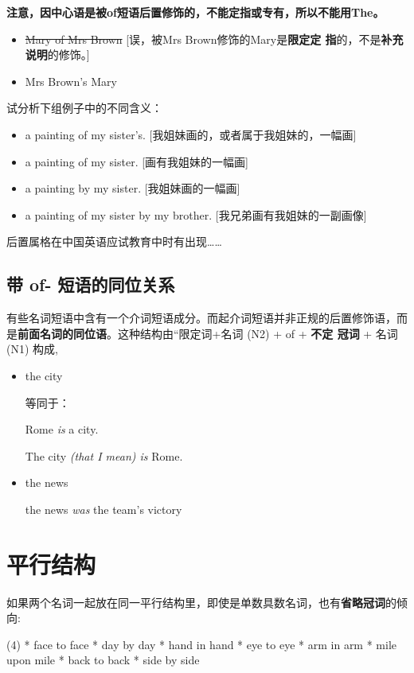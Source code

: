 \textbf{注意，因中心语是被of短语后置修饰的，不能定指或专有，所以不能用The。}

\begin{itemize}
\item \sout{Mary of Mrs Brown} [误，被Mrs Brown修饰的Mary是\textbf{限定定
    指}的，不是\textbf{补充说明}的修饰。]

\item Mrs Brown's Mary
\end{itemize}

试分析下组例子中的不同含义：
\begin{itemize}
\item a painting of my sister's. [我姐妹画的，或者属于我姐妹的，一幅画]
\item a painting of my sister. [画有我姐妹的一幅画]
\item a painting by my sister. [我姐妹画的一幅画]
\item a painting of my sister by my brother. [我兄弟画有我姐妹的一副画像]
\end{itemize}

后置属格在中国英语应试教育中时有出现……

\subsection{带 of- 短语的同位关系}

有些名词短语中含有一个介词短语成分。而起介词短语并非正规的后置修饰语，而
是\textbf{前面名词的同位语}。这种结构由“限定词+名词 (N2) + of + \textbf{不定
  冠词} + 名词 (N1) 构成,

\begin{itemize}
\item the city 

  等同于：

  Rome \emph{is} a city.

  The city \emph{(that I mean) is} Rome.

\item the news 

  the news \emph{was} the team's victory
\end{itemize}


\section{平行结构}

如果两个名词一起放在同一平行结构里，即使是单数具数名词，也有\textbf{省略冠词}的倾向:
\begin{taskitem}(4)
  * face to face
  * day by day
  * hand in hand
  * eye to eye
  * arm in arm
  * mile upon mile
  * back to back
  * side by side
\end{taskitem}

